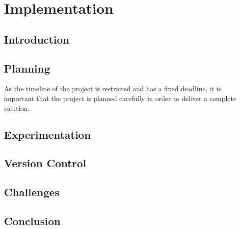 \chapter{Implementation}
\label{ch:implementation}
\section{Introduction}

\section{Planning}
As the timeline of the project is restricted and has a fixed deadline, it is important that the project is planned carefully in order to deliver a complete solution. 

\section{Experimentation}

\section{Version Control}

\section{Challenges}

\section{Conclusion}



